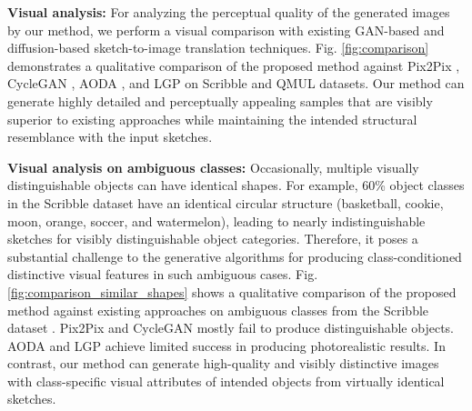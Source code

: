 \vspace{0.5em}

\noindent
\textbf{Visual analysis:} For analyzing the perceptual quality of the generated images by our method, we perform a visual comparison with existing GAN-based \cite{isola2017image,xiang2022adversarial,zhu2017unpaired} and diffusion-based \cite{voynov2023sketch} sketch-to-image translation techniques. Fig. \ref{fig:comparison} demonstrates a qualitative comparison of the proposed method against Pix2Pix \cite{isola2017image}, CycleGAN \cite{zhu2017unpaired}, AODA \cite{xiang2022adversarial}, and LGP \cite{voynov2023sketch} on Scribble \cite{ghosh2019interactive} and QMUL \cite{song2017deep,yu2016sketch} datasets. Our method can generate highly detailed and perceptually appealing samples that are visibly superior to existing approaches while maintaining the intended structural resemblance with the input sketches.

\vspace{0.5em}

\noindent
\textbf{Visual analysis on ambiguous classes:} Occasionally, multiple visually distinguishable objects can have identical shapes. For example, 60\% object classes in the Scribble dataset \cite{ghosh2019interactive} have an identical circular structure (basketball, cookie, moon, orange, soccer, and watermelon), leading to nearly indistinguishable sketches for visibly distinguishable object categories. Therefore, it poses a substantial challenge to the generative algorithms for producing class-conditioned distinctive visual features in such ambiguous cases. Fig. \ref{fig:comparison_similar_shapes} shows a qualitative comparison of the proposed method against existing approaches \cite{isola2017image,voynov2023sketch,xiang2022adversarial,zhu2017unpaired} on ambiguous classes from the Scribble dataset \cite{ghosh2019interactive}. Pix2Pix \cite{isola2017image} and CycleGAN \cite{zhu2017unpaired} mostly fail to produce distinguishable objects. AODA \cite{xiang2022adversarial} and LGP \cite{voynov2023sketch} achieve limited success in producing photorealistic results. In contrast, our method can generate high-quality and visibly distinctive images with class-specific visual attributes of intended objects from virtually identical sketches.

\vspace{-0.5em}

